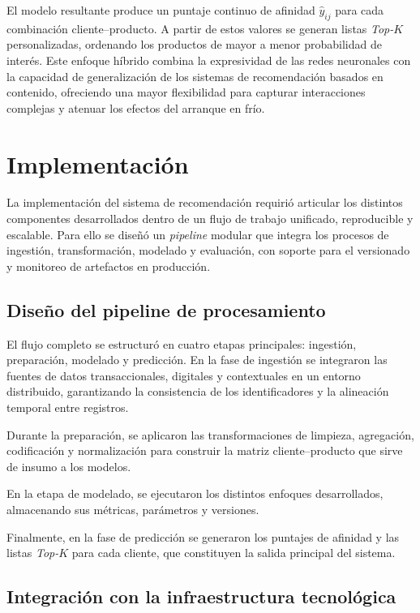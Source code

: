 El modelo resultante produce un puntaje continuo de afinidad $\hat{y}_{ij}$ para cada combinación cliente–producto. A partir de estos valores se generan listas \textit{Top-$K$} personalizadas, ordenando los productos de mayor a menor probabilidad de interés. Este enfoque híbrido combina la expresividad de las redes neuronales con la capacidad de generalización de los sistemas de recomendación basados en contenido, ofreciendo una mayor flexibilidad para capturar interacciones complejas y atenuar los efectos del arranque en frío.


\section{Implementación}

La implementación del sistema de recomendación requirió articular los distintos componentes desarrollados dentro de un flujo de trabajo unificado, reproducible y escalable. Para ello se diseñó un \textit{pipeline} modular que integra los procesos de ingestión, transformación, modelado y evaluación, con soporte para el versionado y monitoreo de artefactos en producción.

\subsection{Diseño del pipeline de procesamiento}

El flujo completo se estructuró en cuatro etapas principales: ingestión, preparación, modelado y predicción.  
En la fase de ingestión se integraron las fuentes de datos transaccionales, digitales y contextuales en un entorno distribuido, garantizando la consistencia de los identificadores y la alineación temporal entre registros. 

Durante la preparación, se aplicaron las transformaciones de limpieza, agregación, codificación y normalización para construir la matriz cliente–producto que sirve de insumo a los modelos.

En la etapa de modelado, se ejecutaron los distintos enfoques desarrollados, almacenando sus métricas, parámetros y versiones.

Finalmente, en la fase de predicción se generaron los puntajes de afinidad y las listas \textit{Top-$K$} para cada cliente, que constituyen la salida principal del sistema.

\subsection{Integración con la infraestructura tecnológica}

